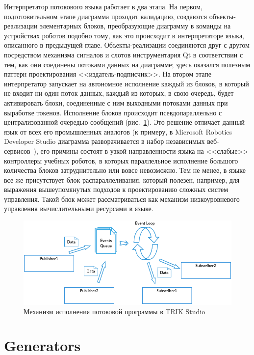 \documentclass[conference]{IEEEtran}
\begin{document}
Интерпретатор потокового языка работает в два этапа. На первом, подготовительном этапе диаграмма проходит валидацию, создаются объекты-реализации элементарных блоков, преобразующие диаграмму в команды на устройствах роботов подобно тому, как это происходит в интерпретаторе языка, описанного в предыдущей главе. Объекты-реализации соединяются друг с другом посредством механизма сигналов и слотов инструментария Qt в соответствии с тем, как они соединены потоками данных на диаграмме; здесь оказался полезным паттерн проектирования <<издатель-подписчик>>. На втором этапе интерпретатор запускает на автономное исполнение каждый из блоков, в который не входит ни один поток данных, каждый из которых, в свою очередь, будет активировать блоки, соединенные с ним выходными потоками данных при выработке токенов. Исполнение блоков происходит псевдопараллельно с централизованной очередью сообщений (рис.~\ref{image:dsPseudoparallelism}). Это решение отличает данный язык от всех его промышленных аналогов (к примеру, в Microsoft Robotics Developer Studio диаграмма разворачивается в набор независимых веб-сервисов~\cite{jackson2007microsoft}), его причины состоят в узкой направленности языка на <<слабые>> контроллеры учебных роботов, в которых параллельное исполнение большого количества блоков затруднительно или вовсе невозможно. Тем не менее, в языке все же присутствует блок распараллеливания, который полезен, например, для выражения вышеупомянутых подходов к проектированию сложных систем управления. Такой блок может рассматриваться как механизм низкоуровневого управления вычислительными ресурсами в языке.

\begin{figure}[ht]
    \centering
    \includegraphics[width=\columnwidth]{DF_Interpretation_Process.png}
    \caption{Механизм исполнения потоковой программы в TRIK Studio}
    \label{image:dsPseudoparallelism}
\end{figure}

\section{Generators}
\label{chapter:generators}
\end{document}
